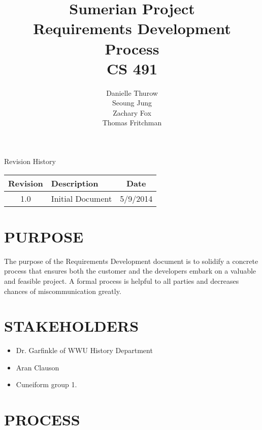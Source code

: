 \documentclass[11pt]{article}
\title{Sumerian Project\\
Requirements Development Process\\
CS 491}
\author{Danielle Thurow \\
Seoung Jung\\
Zachary Fox\\
Thomas Fritchman}
\date{}
\begin{document}
\maketitle
\newpage

\tableofcontents
\newpage

\begin{center}
\Large Revision History\\
\begin{tabularx}{\textwidth}{|c|X|c|}
    \hline
    \textbf{Revision} & \textbf{Description} & \textbf{Date}\\ \hline
    1.0 & Initial Document & 5/9/2014\\ \hline
\end{tabularx}
\end{center}
\newpage

\section{PURPOSE}
The purpose of the Requirements Development document is to solidify a concrete process that ensures both the customer and the developers embark on a valuable and feasible project. A formal process is helpful to all parties and decreases chances of miscommunication greatly.

\section{STAKEHOLDERS}
\begin{itemize}
    \item Dr. Garfinkle of WWU History Department
    \item Aran Clauson
    \item Cuneiform group 1.
\end{itemize}

\section{PROCESS}
\end{document}
